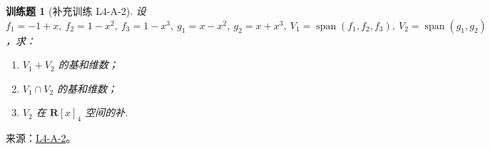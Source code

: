 \documentclass[UTF8,12pt,a4paper,fontset=fandol]{ctexart}
\newtheorem{exercise}{训练题}[section]
\begin{document}
\begin{exercise}[补充训练 L4-A-2]\label{prob:L4-A-2}
设 $f_1=-1+x,\ f_2=1-x^2,\ f_3=1-x^3,\ g_1=x-x^2,\ g_2=x+x^3,\ V_1=\operatorname{span}(f_1,f_2,f_3),\ V_2=\operatorname{span}(g_1,g_2)$，求：
        \begin{enumerate}
            \item $V_1+V_2$ 的基和维数；
            \item $V_1 \cap V_2$ 的基和维数；
            \item $V_2$ 在 $\mathbf{R}[x]_4$ 空间的补.
        \end{enumerate}
\end{exercise}
\noindent 来源：\href{https://github.com/yhwu-is/Linear-Algebra-Left-Undone/blob/new/%E8%AE%B2%E4%B9%89/%E4%B8%93%E9%A2%98/4%20%E7%BA%BF%E6%80%A7%E7%A9%BA%E9%97%B4%E7%9A%84%E8%BF%90%E7%AE%97.tex}{L4-A-2}。
\end{document}
